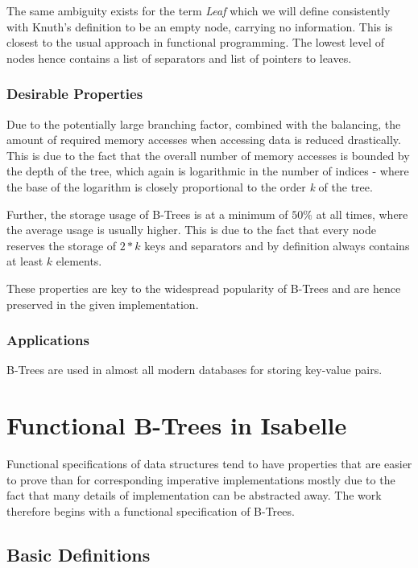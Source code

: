 The same ambiguity exists for the term \textit{Leaf} which we will define consistently with Knuth's definition \parencite{DBLP:books/lib/Knuth98a}
to be an empty node, carrying no information.
This is closest to the usual approach in functional programming.
The lowest level of nodes hence contains a list of separators and
list of pointers to leaves.


\subsection{Desirable Properties}

Due to the potentially large branching factor, combined with the balancing,
the amount of required memory accesses when accessing data is reduced drastically.
This is due to the fact that the overall number of memory accesses is bounded by the depth
of the tree, which again is logarithmic in the number of indices -
where the base of the logarithm is closely proportional to the order \textit{k} of the tree.

Further, the storage usage of B-Trees is at a minimum of $50\%$ at all times,
where the average usage is usually higher. \parencite{DBLP:journals/acta/BayerM72}
This is due to the fact that every node reserves the storage of $2*k$ keys and separators
and by definition always contains at least $k$ elements.

These properties are key to the widespread popularity of B-Trees and are
hence preserved in the given implementation.


\subsection{Applications}

B-Trees are used in almost all modern databases for storing key-value pairs.

\chapter{Functional B-Trees in Isabelle}

Functional specifications of data structures tend to have properties that
are easier to prove than for corresponding imperative implementations
mostly due to the fact that many details of implementation can be abstracted away.
The work therefore begins with a functional specification of B-Trees.

\section{Basic Definitions}
\label{sec:basic-defs}

